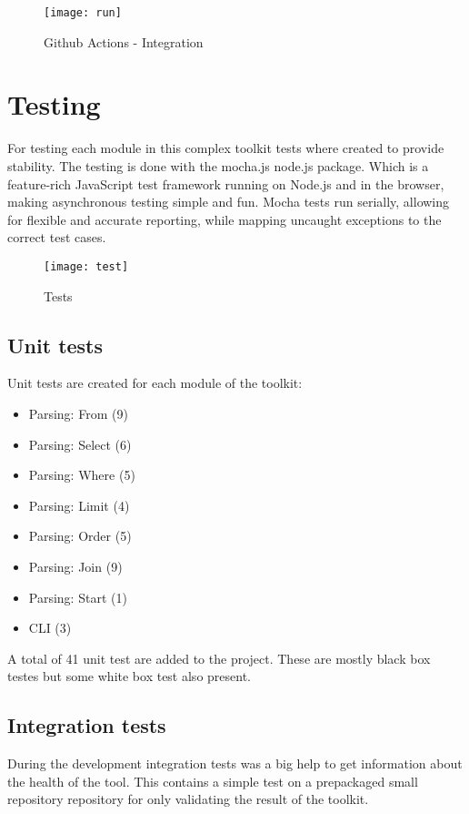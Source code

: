 \begin{figure}[H]
	\centering
	\texttt{[image: run]}
	\caption{Github Actions - Integration}
	\label{fig:fig-int}
\end{figure}


\section{Testing}

For testing each module in this complex toolkit tests where created to provide stability. The testing is done with the mocha.js\cite{mocha} node.js package. Which is a feature-rich JavaScript test framework running on Node.js and in the browser, making asynchronous testing simple and fun. Mocha tests run serially, allowing for flexible and accurate reporting, while mapping uncaught exceptions to the correct test cases.

\begin{figure}[H]
	\centering
	\texttt{[image: test]}
	\caption{Tests}
	\label{fig:fig-test}
\end{figure}

\subsection{Unit tests}

Unit tests are created for each module of the toolkit:

\begin{itemize}
	\item Parsing: From (9)
	\item Parsing: Select (6)
	\item Parsing: Where (5)
	\item Parsing: Limit (4)
	\item Parsing: Order (5)
	\item Parsing: Join (9)
	\item Parsing: Start (1)
	\item CLI (3)
\end{itemize}

A total of 41 unit test are added to the project. These are mostly black box testes but some white box test also present.

\subsection{Integration tests}

During the development integration tests was a big help to get information about the health of the tool. This contains a simple test on a prepackaged small repository repository for only validating the result of the toolkit.

